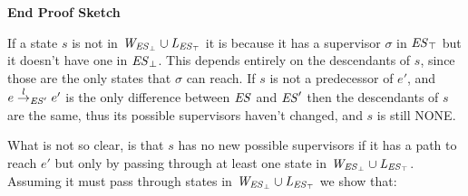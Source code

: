 \textbf{{End Proof Sketch}}

If a state $s$ is not in $\mathit{W_{\mathit{\mathit{ES}_{\bot}}}} \cup \mathit{L_{\mathit{\mathit{ES}_{\top}}}}$ it is because it has a  supervisor $\sigma$ in $\mathit{\mathit{ES}_{\top}}$ but it doesn't have one in $\mathit{\mathit{ES}_{\bot}}$. This depends entirely on the descendants of $s$, since those are the only states that $\sigma$ can reach. If $s$ is not a predecessor of $e'$, and $e \overset{l}{\rightarrow}_{\mathit{ES}'} e'$ is the only difference between $\mathit{ES}$ and $\mathit{ES}'$ then the descendants of $s$ are the same, thus its possible supervisors haven't changed, and $s$ is still NONE.

What is not so clear, is that $s$ has no new possible supervisors if it has a path to reach $e'$ but only by passing through at least one state in $\mathit{W_{\mathit{\mathit{ES}_{\bot}}}} \cup \mathit{L_{\mathit{\mathit{ES}_{\top}}}}$. Assuming it must pass through states in $\mathit{W_{\mathit{\mathit{ES}_{\bot}}}} \cup \mathit{L_{\mathit{\mathit{ES}_{\top}}}}$ we show that:


